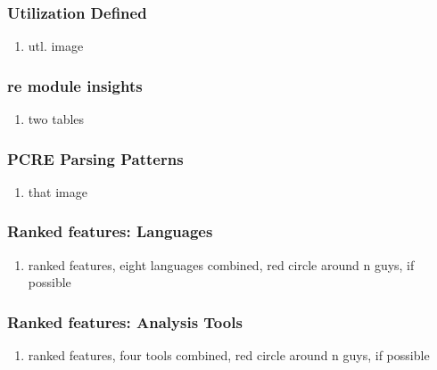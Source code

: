 
\begin{frame}
\frametitle{Utilization Defined}
\begin{enumerate}
\item utl. image
\end{enumerate}
\end{frame}



\begin{frame}
\frametitle{re module insights}
\begin{enumerate}
\item two tables
\end{enumerate}
\end{frame}



\begin{frame}
\frametitle{PCRE Parsing Patterns}
\begin{enumerate}
\item that image
\end{enumerate}
\end{frame}



\begin{frame}
\frametitle{Ranked features: Languages}
\begin{enumerate}
\item ranked features, eight languages combined, red circle around n guys, if possible
\end{enumerate}
\end{frame}


\begin{frame}
\frametitle{Ranked features: Analysis Tools}
\begin{enumerate}
\item ranked features, four tools combined, red circle around n guys, if possible
\end{enumerate}
\end{frame}



